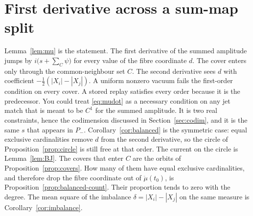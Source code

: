 \section{First derivative across a sum-map split}
\label{sec:h-jet}

Lemma~\ref{lem:mu} is the statement.
The first derivative of the summed amplitude jumps by
\(i\bigl(s+\sum_C\psi\bigr)\) for every value of the fibre coordinate \(d\).
The cover enters only through the common-neighbour set \(C\).
The second derivative sees \(d\) with coefficient
\(-\tfrac12(|X_i|-|X_j|)\).
A uniform nonzero vacuum fails the first-order condition on every cover.
A stored replay satisfies every order because it is the predecessor.
You could treat \eqref{eq:mudot} as a necessary condition on any jet match
that is meant to be \(C^1\) for the summed amplitude.
It is two real constraints, hence the codimension discussed in
Section~\ref{sec:codim}, and it is the same \(s\) that appears in \(P_-\).
Corollary~\ref{cor:balanced} is the symmetric case:
equal exclusive cardinalities remove \(d\) from the second derivative,
so the circle of Proposition~\ref{prop:circle} is still free at that order.
The current on the circle is Lemma~\ref{lem:BJ}.
The covers that enter \(C\) are the orbits of Proposition~\ref{prop:covers}.
How many of them have equal exclusive cardinalities, and therefore drop
the fibre coordinate out of \(\ddot\mu(t_0)\), is
Proposition~\ref{prop:balanced-count}.
Their proportion tends to zero with the degree.
The mean square of the imbalance \(\delta=|X_i|-|X_j|\) on the same
measure is Corollary~\ref{cor:imbalance}.
